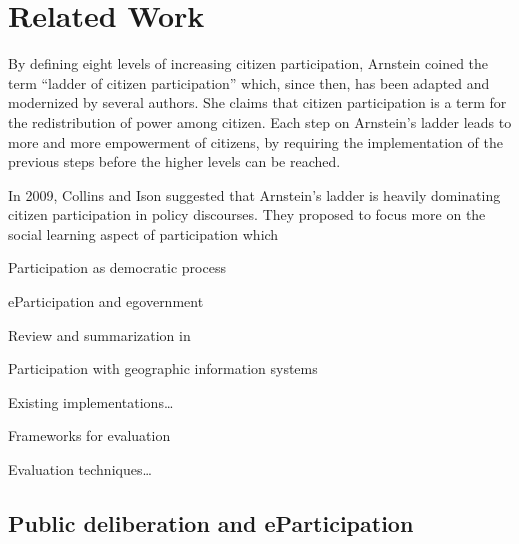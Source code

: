 \section{Related Work}
\label{chap:related_work}

By defining eight levels of increasing citizen participation, Arnstein \cite{Arnstein1969_citizen_participation} coined the term ``ladder of citizen participation'' which, since then, has been adapted and modernized \cite{Cai2009_spatial_annotation_deliberation,Connor1988_new_ladder,Collins2009_social_learning,carver2003future,you2009_participatory_map_based} by several authors. She claims that citizen participation is a term for the redistribution of power among citizen. Each step on Arnstein's ladder leads to more and more empowerment of citizens, by requiring the implementation of the previous steps before the higher levels can be reached.

In 2009, Collins and Ison \cite{Collins2009_social_learning} suggested that Arnstein's ladder is heavily dominating citizen participation in policy discourses. They proposed to focus more on the social learning aspect of participation which 

Participation as democratic process \cite{Collins2009_social_learning} \cite{Renn1993_participation}

\cite{Kent1998_dialogic_relationships_through_www}
\cite{Reddick2005_Citizen_interaction_with_egovernment}
 
\cite{Wright2007_deliberation_design}

eParticipation and egovernment \cite{Bimber1999_Citizen_communication_with_government} \cite{Jaeger2005_deliberate_democracy_and_egovernment} \cite{Macintosh2004_eParticipation_characterization}

Review and summarization in \cite{Saebo_eParticipation,Medaglia2012_eParticipation}


Participation with geographic information systems \cite{zhao2006geodf} \cite{Tang2005_PPGIS_discussion_forum} \cite{Rinner_ArgumentationMaps} \cite{Schlossberg2005_PPGIS} \cite{densham_sdss} \cite{Jankowski2005_community_based_pgis} \cite{Longueville2010_community_based_geoportals_web20} \cite{Rinner2009_Web2_argumap} \cite{sidlar_argumap_2007} \cite{Simao2009Webbased} \cite{Voss2004_Evolution_PGIS} \cite{Blaschke2004_PGIS_critically_revised} \cite{Sieber2006_PublicParticipationGIS}


Existing implementations\dots \cite{Rinner2007_geovis_decisionsupport} \cite{Boroushaki2010_ParticipatoryGIS} \cite{Kessler2005_ArgumentationMapPrototype} \cite{Kessler2005_Conflict_Resolution} \cite{Meng2010_ArgooMap_evaluation} \cite{Meng2010_WebPPGIS_Usability} \cite{Sani2011_Scalable_Argumap}


Frameworks for evaluation \cite{Walker2013Qualitative}

Evaluation techniques\dots 


\subsection{Public deliberation and eParticipation}

